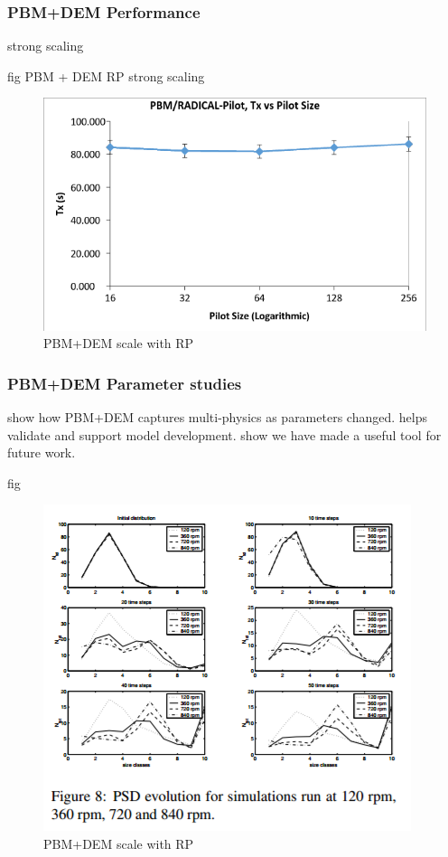 \documentclass[preprint,11pt,authoryear]{elsarticle}
\begin{document}
	    \subsubsection{PBM+DEM Performance}
	    \par strong scaling
	    \par fig PBM + DEM RP strong scaling 
	      \begin{figure}[!htb]
	      \centering
	      \includegraphics[scale=0.5]{rslts_pbmbyrp_strng}
	      \caption{PBM+DEM scale with RP}
	      \label{fig:rslts_dembyRP_strng}
	      \end{figure}
	
	
	
	   \subsubsection{PBM+DEM Parameter studies}
	   \par show how PBM+DEM captures multi-physics as parameters changed. helps validate and support model development. show we have made a useful tool for future work.
	   \par fig 
	      \begin{figure}[H]
	      \centering
	      \includegraphics[scale=0.7]{rslts_psd_evo_time}
	      \caption{PBM+DEM scale with RP}
	      \label{fig:rslts_psd_evo_time}
	      \end{figure}
	    
\end{document}
